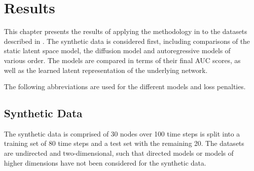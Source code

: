 \chapter{Results}\label{ch:Results}

This chapter presents the results of applying the methodology in  to the datasets described in . The synthetic data is considered first, including comparisons of the static latent space model, the diffusion model and autoregressive models of various order. The models are compared in terms of their final AUC scores, as well as the learned latent representation of the underlying network.

The following abbreviations are used for the different models and loss penalties.




\section{Synthetic Data}

The synthetic data is comprised of 30 nodes over 100 time steps is split into a training set of 80 time steps and a test set with the remaining 20. The datasets are undirected and two-dimensional, such that directed models or models of higher dimensions have not been considered for the synthetic data.




